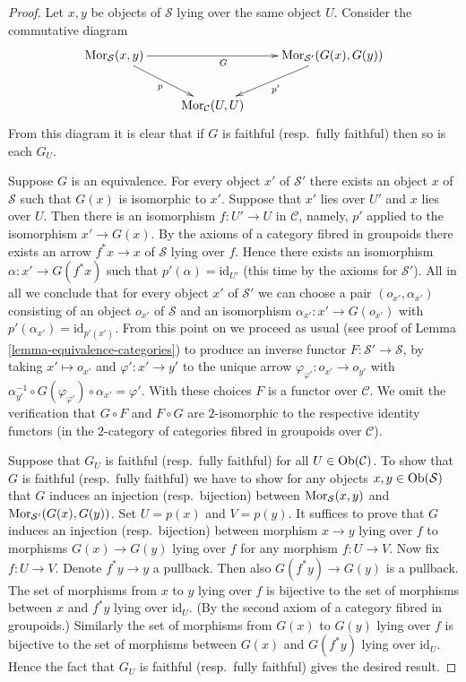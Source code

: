 \begin{proof}
Let $x, y$ be objects of $\mathcal{S}$ lying over the same object $U$.
Consider the commutative diagram
$$
\xymatrix{
\Mor_\mathcal{S}(x, y) \ar[rd]_p \ar[rr]_G & &
\Mor_{\mathcal{S}'}(G(x), G(y)) \ar[ld]^{p'} \\
& \Mor_\mathcal{C}(U, U) &
}
$$
From this diagram it is clear that if $G$ is faithful (resp.\ fully faithful)
then so is each $G_U$.

\medskip\noindent
Suppose $G$ is an equivalence. For every object
$x'$ of $\mathcal{S}'$ there exists an object $x$ of $\mathcal{S}$
such that $G(x)$ is isomorphic to $x'$. Suppose that $x'$ lies
over $U'$ and $x$ lies over $U$. Then there is an isomorphism
$f : U' \to U$ in $\mathcal{C}$, namely, $p'$ applied to the
isomorphism $x' \to G(x)$. By the axioms of a category fibred
in groupoids there exists an arrow $f^*x \to x$ of $\mathcal{S}$
lying over $f$. Hence there exists an isomorphism
$\alpha : x' \to G(f^*x)$ such that $p'(\alpha) = \text{id}_{U'}$
(this time by the axioms for $\mathcal{S}'$). All in all we conclude
that for every object $x'$ of $\mathcal{S}'$ we can choose
a pair $(o_{x'}, \alpha_{x'})$ consisting of an object
$o_{x'}$ of $\mathcal{S}$ and an isomorphism $\alpha_{x'} : x' \to G(o_{x'})$
with $p'(\alpha_{x'}) = \text{id}_{p'(x')}$.
From this point on we proceed as usual (see proof of
Lemma \ref{lemma-equivalence-categories}) to produce an inverse
functor $F : \mathcal{S}' \to \mathcal{S}$, by taking
$x' \mapsto o_{x'}$ and $\varphi' : x' \to y'$ to the unique
arrow $\varphi_{\varphi'} : o_{x'} \to o_{y'}$ with
$\alpha_{y'}^{-1} \circ G(\varphi_{\varphi'}) \circ \alpha_{x'} = \varphi'$.
With these choices $F$ is a functor over $\mathcal{C}$.
We omit the verification that $G \circ F$ and $F \circ G$ are
$2$-isomorphic to the respective identity functors
(in the $2$-category of categories fibred in groupoids over $\mathcal{C}$).

\medskip\noindent
Suppose that $G_U$ is faithful (resp.\ fully faithful)
for all $U\in\mathop{\mathrm{Ob}}\nolimits(\mathcal C)$. To
show that $G$ is faithful (resp.\ fully faithful)
we have to show for any objects
$x, y\in\mathop{\mathrm{Ob}}\nolimits(\mathcal{S})$ that $G$ induces an
injection (resp.\ bijection) between
$\mathop{\mathrm{Mor}}\nolimits_\mathcal{S}(x, y)$ and
$\mathop{\mathrm{Mor}}\nolimits_{\mathcal{S}'}(G(x), G(y))$.
Set $U = p(x)$ and $V = p(y)$.
It suffices to prove that $G$
induces an injection (resp.\ bijection) between morphism
$x \to y$ lying over $f$ to morphisms $G(x) \to G(y)$ lying over $f$
for any morphism $f : U \to V$.
Now fix $f : U \to V$. Denote $f^*y \to y$ a pullback.
Then also $G(f^*y) \to G(y)$ is a pullback.
The set of morphisms from $x$ to $y$ lying over $f$
is bijective to the set of morphisms between
$x$ and $f^*y$ lying over $\text{id}_U$. (By the second axiom
of a category fibred in groupoids.) Similarly
the set of morphisms from $G(x)$ to $G(y)$ lying over $f$
is bijective to the set of morphisms between
$G(x)$ and $G(f^*y)$ lying over $\text{id}_U$.
Hence the fact that $G_U$ is faithful (resp.\ fully faithful)
gives the desired result.


\end{proof}

